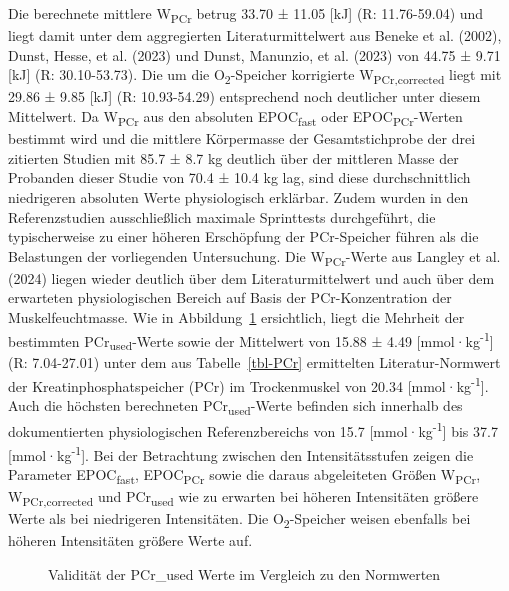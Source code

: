 \documentclass[
  letterpaper,
  DIV=11]{scrartcl}
\begin{document}
Die berechnete mittlere W\textsubscript{PCr} betrug 33.70 ± 11.05
{[}kJ{]} (R: 11.76-59.04) und liegt damit unter dem aggregierten
Literaturmittelwert aus Beneke et al. (2002), Dunst, Hesse, et al.
(2023) und Dunst, Manunzio, et al. (2023) von 44.75 ± 9.71 {[}kJ{]} (R:
30.10-53.73). Die um die O\textsubscript{2}-Speicher korrigierte
W\textsubscript{PCr,corrected} liegt mit 29.86 ± 9.85 {[}kJ{]} (R:
10.93-54.29) entsprechend noch deutlicher unter diesem Mittelwert. Da
W\textsubscript{PCr} aus den absoluten EPOC\textsubscript{fast} oder
EPOC\textsubscript{PCr}-Werten bestimmt wird und die mittlere
Körpermasse der Gesamtstichprobe der drei zitierten Studien mit 85.7 ±
8.7 kg deutlich über der mittleren Masse der Probanden dieser Studie von
70.4 ± 10.4 kg lag, sind diese durchschnittlich niedrigeren absoluten
Werte physiologisch erklärbar. Zudem wurden in den Referenzstudien
ausschließlich maximale Sprinttests durchgeführt, die typischerweise zu
einer höheren Erschöpfung der PCr-Speicher führen als die Belastungen
der vorliegenden Untersuchung. Die W\textsubscript{PCr}-Werte aus
Langley et al. (2024) liegen wieder deutlich über dem
Literaturmittelwert und auch über dem erwarteten physiologischen Bereich
auf Basis der PCr-Konzentration der Muskelfeuchtmasse. Wie in
Abbildung~\ref{fig-PCr_Ref} ersichtlich, liegt die Mehrheit der
bestimmten PCr\textsubscript{used}-Werte sowie der Mittelwert von 15.88
± 4.49 {[}mmol·kg\textsuperscript{-1}{]} (R: 7.04-27.01) unter dem aus
Tabelle~\ref{tbl-PCr} ermittelten Literatur-Normwert der
Kreatinphosphatspeicher (PCr) im Trockenmuskel von 20.34
{[}mmol·kg\textsuperscript{-1}{]}. Auch die höchsten berechneten
PCr\textsubscript{used}-Werte befinden sich innerhalb des dokumentierten
physiologischen Referenzbereichs von 15.7
{[}mmol·kg\textsuperscript{-1}{]} bis 37.7
{[}mmol·kg\textsuperscript{-1}{]}. Bei der Betrachtung zwischen den
Intensitätsstufen zeigen die Parameter EPOC\textsubscript{fast},
EPOC\textsubscript{PCr} sowie die daraus abgeleiteten Größen
W\textsubscript{PCr}, W\textsubscript{PCr,corrected} und
PCr\textsubscript{used} wie zu erwarten bei höheren Intensitäten größere
Werte als bei niedrigeren Intensitäten. Die O\textsubscript{2}-Speicher
weisen ebenfalls bei höheren Intensitäten größere Werte auf.

\begin{figure}


\caption{\label{fig-PCr_Ref}Validität der PCr\_used Werte im Vergleich
zu den Normwerten}

\end{figure}%
\end{document}
